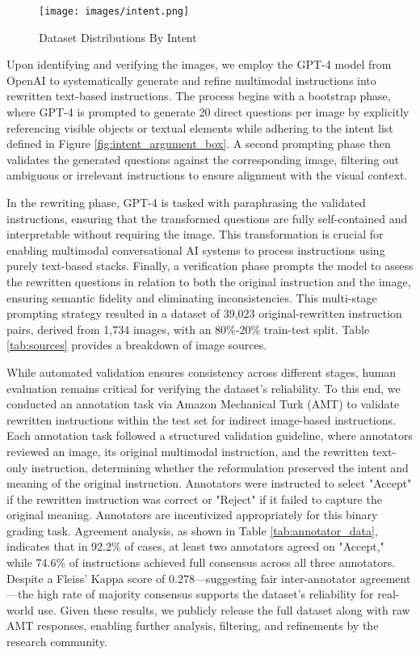 \begin{figure}[t]
\texttt{[image: images/intent.png]}
  \caption{Dataset Distributions By Intent}
  \label{fig:intent}
\end{figure}
Upon identifying and verifying the images, we employ the GPT-4 model from OpenAI \cite{achiam2023gpt} to systematically generate and refine multimodal instructions into rewritten text-based instructions. The process begins with a bootstrap phase, where GPT-4 is prompted to generate 20 direct questions per image by explicitly referencing visible objects or textual elements while adhering to the intent list defined in Figure \ref{fig:intent_argument_box}. A second prompting phase then validates the generated questions against the corresponding image, filtering out ambiguous or irrelevant instructions to ensure alignment with the visual context. 

In the rewriting phase, GPT-4 is tasked with paraphrasing the validated instructions, ensuring that the transformed questions are fully self-contained and interpretable without requiring the image. This transformation is crucial for enabling multimodal conversational AI systems to process instructions using purely text-based stacks. Finally, a verification phase prompts the model to assess the rewritten questions in relation to both the original instruction and the image, ensuring semantic fidelity and eliminating inconsistencies. This multi-stage prompting strategy resulted in a dataset of 39,023 original-rewritten instruction pairs, derived from 1,734 images, with an 80\%-20\% train-test split. Table \ref{tab:sources} provides a breakdown of image sources.

While automated validation ensures consistency across different stages, human evaluation remains critical for verifying the dataset’s reliability. To this end, we conducted an annotation task via Amazon Mechanical Turk (AMT) to validate rewritten instructions within the test set for indirect image-based instructions. Each annotation task followed a structured validation guideline, where annotators reviewed an image, its original multimodal instruction, and the rewritten text-only instruction, determining whether the reformulation preserved the intent and meaning of the original instruction. Annotators were instructed to select "Accept" if the rewritten instruction was correct or "Reject" if it failed to capture the original meaning. Annotators are incentivized appropriately for this binary grading task. Agreement analysis, as shown in Table \ref{tab:annotator_data}, indicates that in 92.2\% of cases, at least two annotators agreed on "Accept," while 74.6\% of instructions achieved full consensus across all three annotators. Despite a Fleiss' Kappa score of 0.278—suggesting fair inter-annotator agreement—the high rate of majority consensus supports the dataset’s reliability for real-world use. Given these results, we publicly release the full dataset along with raw AMT responses, enabling further analysis, filtering, and refinements by the research community.

